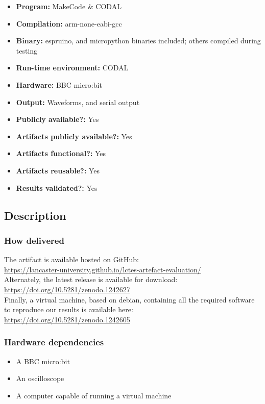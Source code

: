 {\small
\begin{itemize}
  \item {\bf Program:} MakeCode \& CODAL
  \item {\bf Compilation:} arm-none-eabi-gcc
  \item {\bf Binary:} espruino, and micropython binaries included; others compiled during testing
  \item {\bf Run-time environment:} CODAL
  \item {\bf Hardware:} BBC micro:bit
  \item {\bf Output:} Waveforms, and serial output
  \item {\bf Publicly available?:} Yes
  \item {\bf Artifacts publicly available?:} Yes
  \item {\bf Artifacts functional?:} Yes
  \item {\bf Artifacts reusable?:} Yes
  \item {\bf Results validated?:} Yes
\end{itemize}

\subsection{Description}

\subsubsection{How delivered}
The artifact is available hosted on GitHub:\\[5pt]\url{https://lancaster-university.github.io/lctes-artefact-evaluation/}\\[5pt] Alternately, the latest release is available for download:\\[5pt]\url{https://doi.org/10.5281/zenodo.1242627}\\[5pt]Finally, a virtual machine, based on debian, containing all the required software to reproduce our results is available here:\\[5pt]\url{https://doi.org/10.5281/zenodo.1242605}

\subsubsection{Hardware     dependencies}

\begin{itemize}
    \item A BBC micro:bit
    \item An oscilloscope
    \item A computer capable of running a virtual machine
\end{itemize}

}
